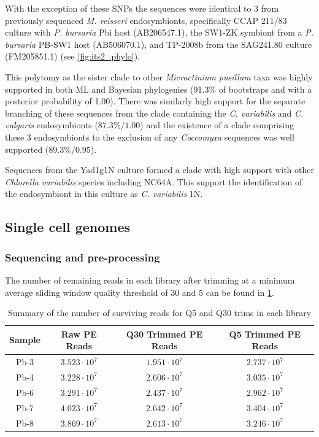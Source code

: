With the exception of these SNPs the sequences were identical to 3 from previously sequenced \textit{M. reisseri} endosymbionts, 
specifically CCAP 211/83 culture with \textit{P. bursaria} Pbi host (AB206547.1), the SW1-ZK symbiont from a \textit{P. bursaria} PB-SW1 host (AB506070.1),
and TP-2008b from the SAG241.80 culture (FM205851.1) (see \cref{fig:its2_phylo}).

This polytomy as the sister clade to other \textit{Micractinium pusillum} 
taxa was highly supported in both ML and Bayesian phylogenies (91.3\% of 
bootstraps and with a posterior probability of 1.00).
There was similarly high support for the separate branching of these sequences
from the clade containing the \textit{C. variabilis} and \textit{C. vulgaris} 
endosymbionts (\(87.3\%/1.00\)) and the existence of a clade comprising these 3
endosymbionts to the exclusion of any \textit{Coccomyxa} sequences was well supported
(\(89.3\%/0.95\)). 

Sequences from the Yad1g1N culture formed a clade with high support 
with other \textit{Chlorella variabilis} species including NC64A.
This support the identification of the endosymbiont in this culture
as \textit{C. variabilis} 1N.



\subsection{Single cell genomes}

\subsubsection{Sequencing and pre-processing}

The number of remaining reads in each library after trimming at a minimum average 
sliding window quality threshold of 30 and 5 can be found in \cref{tab:genome_trim}.

\begin{table}
    \centering
    \begin{tabular}{|c|c|c|c|}
        \hline
        \textbf{Sample} & \textbf{Raw PE Reads} & \textbf{Q30 Trimmed PE Reads} & \textbf{Q5 Trimmed PE Reads}\\
        \hline
        Pb-3 & \(3.523\cdot10^7\) & \(1.951\cdot10^7\) & \(2.737\cdot10^7\) \\
        Pb-4 & \(3.228\cdot10^7\) & \(2.606\cdot10^7\) & \(3.035\cdot10^7\) \\
        Pb-6 & \(3.291\cdot10^7\) & \(2.437\cdot10^7\) & \(2.962\cdot10^7\) \\
        Pb-7 & \(4.023\cdot10^7\) & \(2.642\cdot10^7\) & \(3.404\cdot10^7\) \\
        Pb-8 & \(3.869\cdot10^7\) & \(2.613\cdot10^7\) & \(3.246\cdot10^7\) \\
        \hline
    \end{tabular}
    \caption[The effect of read trimming threshold across libraries]{Summary of the number
    of surviving reads for Q5 and Q30 trims in each library}
    \label{tab:genome_trim}
\end{table}


